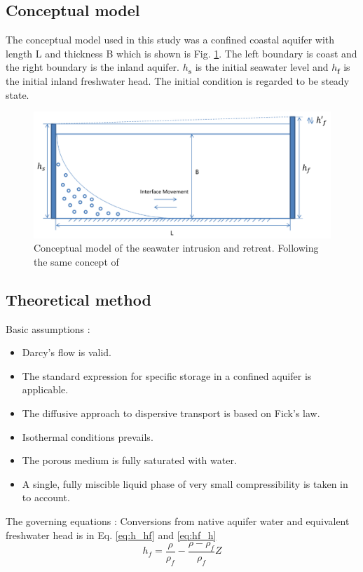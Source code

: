 \documentclass[review]{elsarticle}
\newcommand{\mbf}[1]{{\mathbf{#1}}}%
\begin{document}
\subsection{Conceptual model}

The conceptual model used in this study was a confined coastal aquifer with length L and thickness B which is shown is Fig. \ref{fig:seawater_intrusion}. The left boundary is coast and the right boundary is the inland aquifer. $h_\mbf{s}$ is the initial seawater level and $h_\mbf{f}$ is the initial inland freshwater head. The initial condition is regarded to be steady state. 
\begin{figure}
\centering
\includegraphics[width=1.0\textwidth]{figures/seawater_intrusion}
\caption{Conceptual model of the seawater intrusion and retreat. Following the same concept of \cite{lu2013timescales}}
\label{fig:seawater_intrusion}
\end{figure}

\subsection{Theoretical method}
Basic assumptions \cite{guo2002user}: 
\begin{itemize}
\item Darcy's flow is valid.  
\item The standard expression for specific storage in a confined aquifer is applicable.
\item The diffusive approach to dispersive transport is based on Fick's law.
\item Isothermal conditions prevails. 
\item The porous medium is fully saturated with water.
\item A single, fully miscible liquid phase of very small compressibility is taken in to account. 
\end{itemize}
The governing equations \cite{guo2002user}:
Conversions from native aquifer water and equivalent freshwater head is in Eq. \ref{eq:h_hf} and \ref{eq:hf_h}
\begin{equation}\label{eq:h_hf}
h_f = \frac{\rho}{\rho_f} - \frac{\rho - \rho_f}{\rho_f}Z 
\end{equation}
\end{document}
